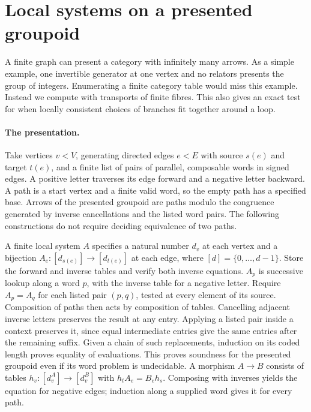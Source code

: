\section{Local systems on a presented groupoid}
\label{sec:forest}
A finite graph can present a category with infinitely many arrows. As a simple example, one invertible generator at one vertex and no relators presents the group of integers. Enumerating a finite category table would miss this example. Instead we compute with transports of finite fibres. This also gives an exact test for when locally consistent choices of branches fit together around a loop.

\paragraph{The presentation.}
Take vertices $v<V$, generating directed edges $e<E$ with source $s(e)$ and target $t(e)$, and a finite list of pairs of parallel, composable words in signed edges. A positive letter traverses its edge forward and a negative letter backward. A path is a start vertex and a finite valid word, so the empty path has a specified base. Arrows of the presented groupoid are paths modulo the congruence generated by inverse cancellations and the listed word pairs. The following constructions do not require deciding equivalence of two paths.

A finite local system $A$ specifies a natural number $d_v$ at each vertex and a bijection $A_e:[d_{s(e)}]\to[d_{t(e)}]$ at each edge, where $[d]=\{0,\ldots,d-1\}$. Store the forward and inverse tables and verify both inverse equations. $A_p$ is successive lookup along a word $p$, with the inverse table for a negative letter. Require $A_p=A_q$ for each listed pair $(p,q)$, tested at every element of its source. Composition of paths then acts by composition of tables. Cancelling adjacent inverse letters preserves the result at any entry. Applying a listed pair inside a context preserves it, since equal intermediate entries give the same entries after the remaining suffix. Given a chain of such replacements, induction on its coded length proves equality of evaluations. This proves soundness for the presented groupoid even if its word problem is undecidable. A morphism $A\to B$ consists of tables $h_v:[d_v^A]\to[d_v^B]$ with $h_t A_e=B_e h_s$. Composing with inverses yields the equation for negative edges; induction along a supplied word gives it for every path.

